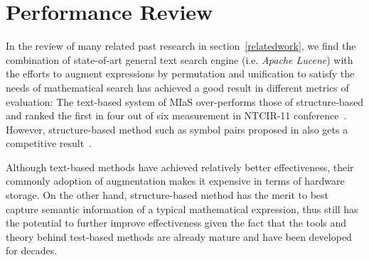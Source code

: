 \section{Performance Review}
In the review of many related past research in section~\ref{relatedwork}, we find the combination of state-of-art general text search engine (i.e. \textit{Apache Lucene}) with the efforts to augment expressions by permutation and unification to satisfy the needs of mathematical search has achieved a good result in different metrics of evaluation: 
The text-based system of MIaS over-performs those of structure-based and ranked the first in four out of six measurement in NTCIR-11 conference~\cite{NTCIR11res}. 
However, structure-based method such as symbol pairs proposed in \cite{symbolpairs15,symbolpair15:2} also gets a competitive result~\cite{NTCIR11res}. 

Although text-based methods have achieved relatively better effectiveness, their commonly adoption of augmentation makes it expensive in terms of hardware storage. 
On the other hand, structure-based method has the merit to best capture semantic information of a typical mathematical expression, thus still has the potential to further improve effectiveness given the fact that the tools and theory behind test-based methods are already mature and have been developed for decades.
